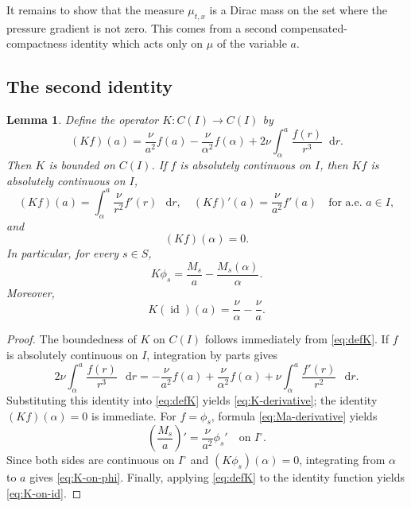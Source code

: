 \documentclass[a4paper,twosided,11pt]{article}
\newcommand{\al}{\alpha}
\newcommand{\1}{\mathbf{1}}
\theoremstyle{plain}
\newtheorem{lemma}[thm]{Lemma}
\theoremstyle{remark}
\newcommand{\diff}{\mathop{} \mathrm{d}}
\numberwithin{equation}{section}
\begin{document}
It remains to show that the measure $\mu_{t,x}$ is a Dirac mass on the set where the pressure gradient is not zero. This comes from a second compensated-compactness identity which acts only on $\mu$ of the variable $a$.

\subsection{The second identity}
\iffalse

\begin{lemma}
\label{lem:operator-K}
Define the operator $K:C(I)\to C(I)$ by
\begin{equation}
\label{eq:defK}
 (Kf)(a)=\frac{\nu}{a^2}f(a)-\frac{\nu}{\al^2}f(\al)+2\nu\int_{\al}^{a}\frac{f(r)}{r^3} \diff r.
\end{equation}
Then $K$ is bounded on $C(I)$. If $f$ is absolutely continuous on $I$, then $Kf$ is absolutely continuous on $I$,
\begin{equation}
\label{eq:K-derivative}
 (Kf)(a)=\int_{\al}^{a}\frac{\nu}{r^2}f'(r)\,\diff r,
 \quad
 (Kf)'(a)=\frac{\nu}{a^2}f'(a)
 \quad \text{for a.e. } a\in I,
\end{equation}
and
$$
 (Kf)(\al)=0.
$$
In particular, for every $s\in S$,
\begin{equation}
\label{eq:K-on-phi}
 K\phi_s = \frac{M_s}{a}-\frac{M_s(\al)}{\al}.
\end{equation}
Moreover,
\begin{equation}
\label{eq:K-on-id}
 K(\operatorname{id})(a)=\frac{\nu}{\al}-\frac{\nu}{a}.
\end{equation}
\end{lemma}

\begin{proof}
The boundedness of $K$ on $C(I)$ follows immediately from \eqref{eq:defK}. If $f$ is absolutely continuous on $I$, integration by parts gives
$$
2\nu\int_{\al}^{a}\frac{f(r)}{r^3}\,\diff r
=
-\frac{\nu}{a^2}f(a)+\frac{\nu}{\al^2}f(\al)
+\nu\int_{\al}^{a}\frac{f'(r)}{r^2}\,\diff r.
$$
Substituting this identity into \eqref{eq:defK} yields \eqref{eq:K-derivative}; the identity $(Kf)(\al)=0$ is immediate. For $f=\phi_s$, formula \eqref{eq:Ma-derivative} yields
$$
 \left(\frac{M_s}{a}\right)'=\frac{\nu}{a^2}\phi_s'
 \quad \text{on } I^\circ.
$$
Since both sides are continuous on $I^\circ$ and $(K\phi_s)(\al)=0$, integrating from $\al$ to $a$ gives \eqref{eq:K-on-phi}. Finally, applying \eqref{eq:defK} to the identity function yields \eqref{eq:K-on-id}.
\end{proof}
\end{document}
